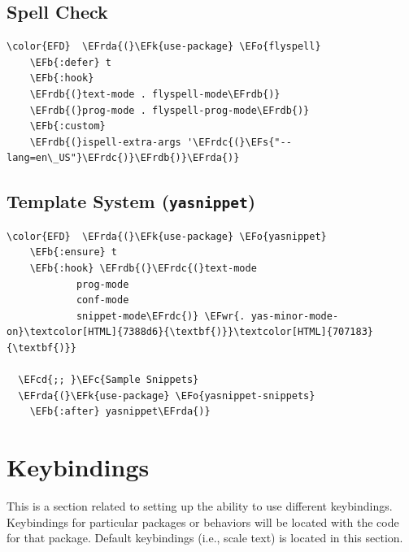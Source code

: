 \documentclass[11pt]{article}
\newcommand{\EFc}[1]{\textcolor{EFc}{#1}} %
\newcommand{\EFcd}[1]{\textcolor{EFcd}{#1}} %
\newcommand{\EFs}[1]{\textcolor{EFs}{#1}} %
\newcommand{\EFk}[1]{\textcolor{EFk}{#1}} %
\newcommand{\EFb}[1]{\textcolor{EFb}{#1}} %
\newcommand{\EFo}[1]{\textcolor{EFo}{#1}} %
\newcommand{\EFwr}[1]{\textcolor{EFwr}{\textbf{#1}}} %
\newcommand{\EFrda}[1]{\textcolor{EFrda}{#1}} %
\newcommand{\EFrdb}[1]{\textcolor{EFrdb}{#1}} %
\newcommand{\EFrdc}[1]{\textcolor{EFrdc}{#1}} %
\begin{document}
\subsection{Spell Check}
\label{sec:org9d60656}
\begin{Code}
\begin{Verbatim}
\color{EFD}  \EFrda{(}\EFk{use-package} \EFo{flyspell}
    \EFb{:defer} t
    \EFb{:hook}
    \EFrdb{(}text-mode . flyspell-mode\EFrdb{)}
    \EFrdb{(}prog-mode . flyspell-prog-mode\EFrdb{)}
    \EFb{:custom} 
    \EFrdb{(}ispell-extra-args '\EFrdc{(}\EFs{"--lang=en\_US"}\EFrdc{)}\EFrdb{)}\EFrda{)}
\end{Verbatim}
\end{Code}

\subsection{Template System (\texttt{yasnippet})}
\label{sec:orga0683ff}
\begin{Code}
\begin{Verbatim}
\color{EFD}  \EFrda{(}\EFk{use-package} \EFo{yasnippet}
    \EFb{:ensure} t
    \EFb{:hook} \EFrdb{(}\EFrdc{(}text-mode
            prog-mode
            conf-mode
            snippet-mode\EFrdc{)} \EFwr{. yas-minor-mode-on}\textcolor[HTML]{7388d6}{\textbf{)}}\textcolor[HTML]{707183}{\textbf{)}}

  \EFcd{;; }\EFc{Sample Snippets}
  \EFrda{(}\EFk{use-package} \EFo{yasnippet-snippets}
    \EFb{:after} yasnippet\EFrda{)}
\end{Verbatim}
\end{Code}

\section{Keybindings}
\label{sec:org1601629}
This is a section related to setting up the ability to use different keybindings. Keybindings for particular packages or behaviors will be located with the code for that package. Default keybindings (i.e., scale text) is located in this section.
\end{document}
